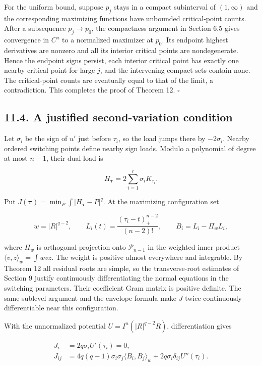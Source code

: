 \documentclass[11pt]{article}
\begin{document}
For the uniform bound, suppose \(p_j\) stays in a compact subinterval of
\((1,\infty)\) and the corresponding maximizing functions have unbounded
critical-point counts. After a subsequence \(p_j\to p_0\), the
compactness argument in Section 6.5 gives convergence in \(C^n\) to a
normalized maximizer at \(p_0\). Its endpoint highest derivatives are
nonzero and all its interior critical points are nondegenerate. Hence
the endpoint signs persist, each interior critical point has exactly one
nearby critical point for large \(j\), and the intervening compact sets
contain none. The critical-point counts are eventually equal to that of
the limit, a contradiction. This completes the proof of Theorem 12.
\(\square\)

\subsection{11.4. A justified second-variation
condition}\label{a-justified-second-variation-condition}

Let \(\sigma_i\) be the sign of \(u'\) just before \(\tau_i\), so the
load jumps there by \(-2\sigma_i\). Nearby ordered switching points
define nearby sign loads. Modulo a polynomial of degree at most \(n-1\),
their dual load is

\[
H_{\boldsymbol\tau}=2\sum_{i=1}^r\sigma_iK_{\tau_i}.
\]

Put \(J(\boldsymbol\tau)=\min_P\int|H_{\boldsymbol\tau}-P|^q\). At the
maximizing configuration set

\[
w=|R|^{q-2},\qquad
L_i(t)=\frac{(\tau_i-t)_+^{n-2}}{(n-2)!},\qquad
B_i=L_i-\Pi_w L_i,
\tag{11.8}
\]

where \(\Pi_w\) is orthogonal projection onto \(\mathcal P_{n-1}\) in
the weighted inner product \(\langle v,z\rangle_w=\int wvz\). The weight
is positive almost everywhere and integrable. By Theorem 12 all residual
roots are simple, so the transverse-root estimates of Section 9 justify
continuously differentiating the normal equations in the switching
parameters. Their coefficient Gram matrix is positive definite. The same
sublevel argument and the envelope formula make \(J\) twice continuously
differentiable near this configuration.

With the unnormalized potential \(U=I^n(|R|^{q-2}R)\), differentiation
gives

\[
\begin{aligned}
J_i&=2q\sigma_iU'(\tau_i)=0,\\
J_{ij}&=4q(q-1)\sigma_i\sigma_j\langle B_i,B_j\rangle_w
+2q\sigma_i\delta_{ij}U''(\tau_i).
\end{aligned}
\tag{11.9}
\]
\end{document}
